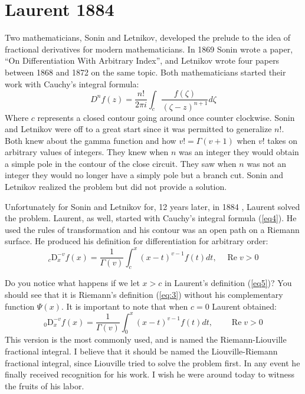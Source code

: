 \documentclass[a4paper,14pt,oneside]{book}
\theoremstyle{plain}
\theoremstyle{definition}
\theoremstyle{remark}
\begin{document}
\section{Laurent 1884}
\begin{center}
         \begin{flushleft} 
         \justify
         \Large{
\par{Two mathematicians, Sonin and Letnikov, developed the prelude to the idea of fractional derivatives for modern mathematicians. In 1869 Sonin wrote a paper, \textquotedblleft On Differentiation With Arbitrary Index\textquotedblright, and Letnikov wrote four papers between 1868 and 1872 on the same topic. Both mathematicians started their work with Cauchy's integral formula:
\begin{equation}\label{eq4}
D^{n} f(z)=\frac{n !}{2 \pi i} \int_{c} \frac{f(\zeta)}{(\zeta-z)^{n+1}} d \zeta 
\end{equation}
Where $c$ represents a closed contour going around once counter clockwise. Sonin and Letnikov were off to a great start since it was permitted to generalize $n!$. Both knew about the gamma function and how $v !=\Gamma(v+1)$ when $v!$ takes on arbitrary values of integers. They knew when $n$ was an integer they would obtain a simple pole in the contour of the close circuit. They saw when $n$ was not an integer they would no longer have a simply pole but a branch cut. Sonin and Letnikov realized the problem but did not provide a solution.
\par{Unfortunately for Sonin and Letnikov for, 12 years later, in 1884 , Laurent solved the problem. Laurent, as well, started with Cauchy's integral formula (\ref{eq4}). He used the rules of transformation and his contour was an open path on a Riemann surface. He produced his definition for differentiation for arbitrary order:}
\begin{equation}\label{eq5}
{ }_{c} \mathrm{D}_{x}^{-v} f(x)=\frac{1}{\Gamma(v)} \int_{c}^{x}(x-t)^{v-1} f(t) dt , \quad \operatorname{Re} v>0
\end{equation}}

\par{Do you notice what happens if we let $x>c$ in Laurent's definition (\ref{eq5})? You should see that it is Riemann's definition (\ref{eq:3}) without his complementary function $\Psi(x)$. It is important to note that when $c=0$ Laurent obtained:
$$
{ }_{0} \mathrm{D}_{x}^{-v} f(x)=\frac{1}{\Gamma(v)} \int_{0}^{x}(x-t)^{v-1} f(t) dt ,  \quad \quad \operatorname{Re} v>0
$$This version is the most commonly used, and is named the Riemann-Liouville fractional integral. I believe that it should be named the Liouville-Riemann fractional integral, since Liouville tried to solve the problem first. In any event he finally received recognition for his work. I wish he were around today to witness the fruits of his labor.}}
\end{flushleft}        \end{center}
\end{document}
